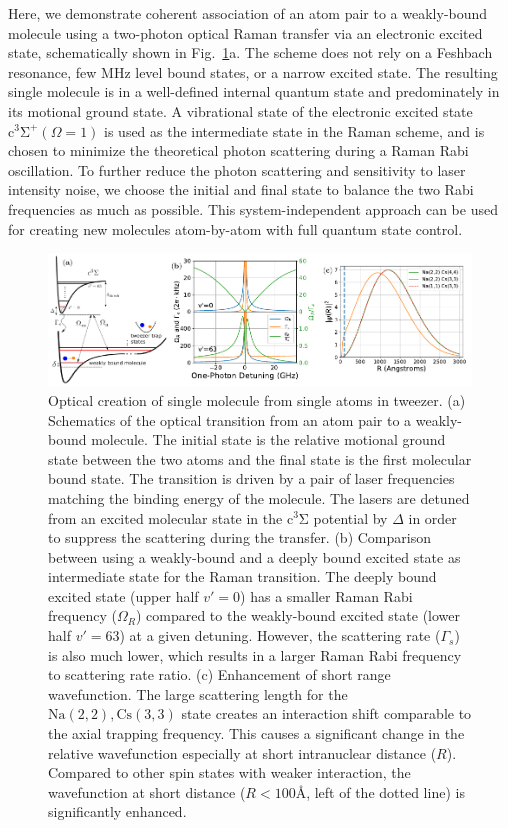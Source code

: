\documentclass[aps,prl,twocolumn,10pt,superscriptaddress]{revtex4-1}
\newcommand{\Na}{\mathrm{Na}}
\newcommand{\Cs}{\mathrm{Cs}}
\begin{document}
Here, we demonstrate coherent association of an atom pair to a weakly-bound molecule using a two-photon optical Raman transfer via an electronic excited state, schematically shown in Fig.~\ref{f-theory}a. The scheme does not rely on a Feshbach resonance, few MHz level bound states, or a narrow excited state. The resulting single molecule is in a well-defined internal quantum state and predominately in its motional ground state. A vibrational state of the electronic excited state $\mathrm{c^3\Sigma^+}(\Omega = 1)$ is used as the intermediate state in the Raman scheme, and is chosen to minimize the theoretical photon scattering during a Raman Rabi oscillation. To further reduce the photon scattering and sensitivity to laser intensity noise, we choose the initial and final state to balance the two Rabi frequencies as much as possible. This system-independent approach can be used for creating new molecules atom-by-atom with full quantum state control.


\begin{figure}
  \includegraphics[width=\textwidth]{fig1.pdf}
  \caption{Optical creation of single molecule from single atoms in tweezer.
    (a) Schematics of the optical transition from an atom pair to a weakly-bound molecule.
    The initial state is the relative motional ground state between the two atoms
    and the final state is the first molecular bound state.
    The transition is driven by a pair of laser frequencies matching the binding energy
    of the molecule.
    The lasers are detuned from an excited molecular state in the $\mathrm{c^3\Sigma}$ potential
    by $\Delta$ in order to suppress the scattering during the transfer.
    (b) Comparison between using a weakly-bound and a deeply bound excited state
    as intermediate state for the Raman transition.
    The deeply bound excited state (upper half $v'=0$)
    has a smaller Raman Rabi frequency ($\Omega_{R}$)
    compared to the weakly-bound excited state (lower half $v'=63$) at a given detuning.
    However, the scattering rate ($\Gamma_{s}$) is also much lower,
    which results in a larger Raman Rabi frequency to scattering rate ratio.
    (c) Enhancement of short range wavefunction.
    The large scattering length for the $\Na(2,2),\Cs(3,3)$ state creates an interaction shift
    comparable to the axial trapping frequency.
    This causes a significant change in the relative wavefunction especially at short
    intranuclear distance ($R$).
    Compared to other spin states with weaker interaction,
    the wavefunction at short distance ($R<100\text{\AA}$, left of the dotted line)
    is significantly enhanced.
    \label{f-theory}
  }
\end{figure}
\end{document}
